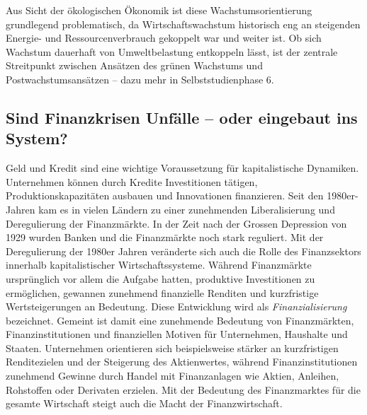 \documentclass[
  nswissgerman,
  a4paper,
  DIV=11,
  numbers=noendperiod,
  oneside,
  openany]{scrreprt}
\begin{document}
Aus Sicht der ökologischen Ökonomik ist diese Wachstumsorientierung
grundlegend problematisch, da Wirtschaftswachstum historisch eng an
steigenden Energie- und Ressourcenverbrauch gekoppelt war und weiter
ist. Ob sich Wachstum dauerhaft von Umweltbelastung entkoppeln lässt,
ist der zentrale Streitpunkt zwischen Ansätzen des grünen Wachstums und
Postwachstumsansätzen -- dazu mehr in Selbststudienphase 6.

\subsection{Sind Finanzkrisen Unfälle -- oder eingebaut ins
System?}\label{sind-finanzkrisen-unfuxe4lle-oder-eingebaut-ins-system}

Geld und Kredit sind eine wichtige Voraussetzung für kapitalistische
Dynamiken. Unternehmen können durch Kredite Investitionen tätigen,
Produktionskapazitäten ausbauen und Innovationen finanzieren. Seit den
1980er-Jahren kam es in vielen Ländern zu einer zunehmenden
Liberalisierung und Deregulierung der Finanzmärkte. In der Zeit nach der
Grossen Depression von 1929 wurden Banken und die Finanzmärkte noch
stark reguliert. Mit der Deregulierung der 1980er Jahren veränderte sich
auch die Rolle des Finanzsektors innerhalb kapitalistischer
Wirtschaftssysteme. Während Finanzmärkte ursprünglich vor allem die
Aufgabe hatten, produktive Investitionen zu ermöglichen, gewannen
zunehmend finanzielle Renditen und kurzfristige Wertsteigerungen an
Bedeutung. Diese Entwicklung wird als \emph{Finanzialisierung}
bezeichnet. Gemeint ist damit eine zunehmende Bedeutung von
Finanzmärkten, Finanzinstitutionen und finanziellen Motiven für
Unternehmen, Haushalte und Staaten. Unternehmen orientieren sich
beispielsweise stärker an kurzfristigen Renditezielen und der Steigerung
des Aktienwertes, während Finanzinstitutionen zunehmend Gewinne durch
Handel mit Finanzanlagen wie Aktien, Anleihen, Rohstoffen oder Derivaten
erzielen. Mit der Bedeutung des Finanzmarktes für die gesamte Wirtschaft
steigt auch die Macht der Finanzwirtschaft.
\end{document}
